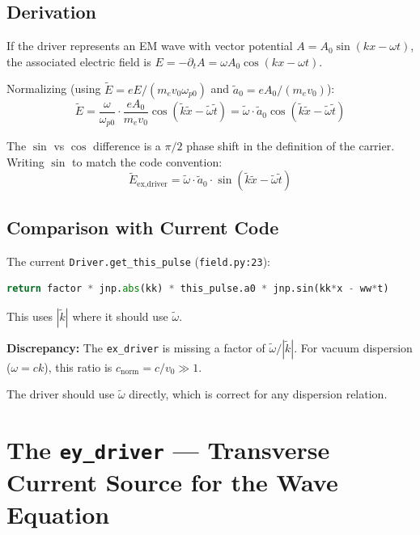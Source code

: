 \documentclass[11pt]{article}
\newcommand{\tl}[1]{\tilde{#1}}
\newcommand{\cnorm}{c_{\text{norm}}}
\newcommand{\wpz}{\omega_{p0}}
\newcommand{\code}[1]{\texttt{#1}}
\begin{document}
\subsection{Derivation}

If the driver represents an EM wave with vector potential $A = A_0 \sin(kx - \omega t)$, the associated electric field is $E = -\partial_t A = \omega A_0 \cos(kx - \omega t)$.

Normalizing (using $\tl{E} = eE/(m_e v_0 \wpz)$ and $\tl{a}_0 = eA_0/(m_e v_0)$):
\begin{equation}
    \tl{E} = \frac{\omega}{\wpz} \cdot \frac{e A_0}{m_e v_0} \cos(\tl{k}\tl{x} - \tl{\omega}\tl{t})
    = \tl{\omega} \cdot \tl{a}_0 \cos(\tl{k}\tl{x} - \tl{\omega}\tl{t})
\end{equation}

The $\sin$ vs $\cos$ difference is a $\pi/2$ phase shift in the definition of the carrier. Writing $\sin$ to match the code convention:
\begin{equation}
    \boxed{\tl{E}_{\text{ex,driver}} = \tl{\omega} \cdot \tl{a}_0 \cdot \sin(\tl{k}\tl{x} - \tl{\omega}\tl{t})}
    \label{eq:ex-driver}
\end{equation}

\subsection{Comparison with Current Code}

The current \code{Driver.get\_this\_pulse} (\code{field.py:23}):
\begin{lstlisting}[language=Python]
return factor * jnp.abs(kk) * this_pulse.a0 * jnp.sin(kk*x - ww*t)
\end{lstlisting}

This uses $|\tl{k}|$ where it should use $\tl{\omega}$.

\begin{center}
\colorbox{red!15}{\parbox{0.85\textwidth}{
\textbf{Discrepancy:} The \code{ex\_driver} is missing a factor of $\tl{\omega}/|\tl{k}|$. For vacuum dispersion ($\omega = ck$), this ratio is $\cnorm = c/v_0 \gg 1$.

The driver should use $\tl{\omega}$ directly, which is correct for any dispersion relation.
}}
\end{center}

\newpage
\section{The \code{ey\_driver} --- Transverse Current Source for the Wave Equation}
\label{sec:ey-driver}
\end{document}
